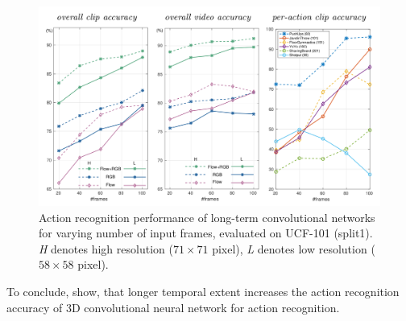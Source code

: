 \begin{figure}[H]
    \centering
    \includegraphics[width=\textwidth]{img_deep/longterm_systematical}
    \caption{Action recognition performance of long-term convolutional networks for varying number of input frames, evaluated on UCF-101 (split1). \textit{H} denotes high resolution ($71 \times 71$ pixel), \textit{L} denotes low resolution ($58 \times 58$ pixel). \cite{varol_long-term_2016}}
    \label{fig:longterm_systematical}
\end{figure}

To conclude, \textcite{varol_long-term_2016} show, that longer temporal extent increases the action recognition accuracy of 3D convolutional neural network for action recognition.

%
%

